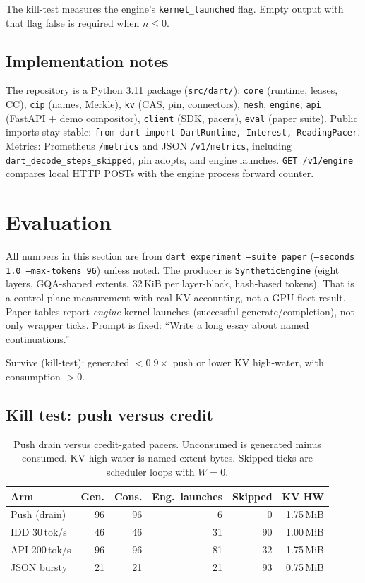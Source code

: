 \documentclass{article}
\theoremstyle{definition}
\begin{document}
The kill-test measures the engine's \texttt{kernel\_launched} flag.
Empty output with that flag false is required when $n \le 0$.

\subsection{Implementation notes}

The repository is a Python 3.11 package (\texttt{src/dart/}): \texttt{core} (runtime, leases, CC), \texttt{cip} (names, Merkle), \texttt{kv} (CAS, pin, connectors), \texttt{mesh}, \texttt{engine}, \texttt{api} (FastAPI + demo compositor), \texttt{client} (SDK, pacers), \texttt{eval} (paper suite).
Public imports stay stable: \texttt{from dart import DartRuntime, Interest, ReadingPacer}.
Metrics: Prometheus \texttt{/metrics} and JSON \texttt{/v1/metrics}, including \texttt{dart\_decode\_steps\_skipped}, pin adopts, and engine launches.
\texttt{GET /v1/engine} compares local HTTP POSTs with the engine process forward counter.

\FloatBarrier
\section{Evaluation}
\label{sec:eval}

All numbers in this section are from \texttt{dart experiment --suite paper} (\texttt{--seconds 1.0 --max-tokens 96}) unless noted.
The producer is \texttt{SyntheticEngine} (eight layers, GQA-shaped extents, 32\,KiB per layer-block, hash-based tokens).
That is a control-plane measurement with real KV accounting, not a GPU-fleet result.
Paper tables report \emph{engine} kernel launches (successful generate/completion), not only wrapper ticks.
Prompt is fixed: ``Write a long essay about named continuations.''

Survive (kill-test): generated $< 0.9\times$ push or lower KV high-water, with consumption $> 0$.

\subsection{Kill test: push versus credit}
\label{sec:kill}

\begin{table}[t]
\centering
\small
\caption{Push drain versus credit-gated pacers. Unconsumed is generated minus consumed. KV high-water is named extent bytes. Skipped ticks are scheduler loops with $W{=}0$.}
\label{tab:kill}
\begin{tabular}{lrrrrr}
\toprule
Arm & Gen. & Cons. & Eng.\ launches & Skipped & KV HW \\
\midrule
Push (drain) & 96 & 96 & 6 & 0 & 1.75\,MiB \\
IDD 30\,tok/s & 46 & 46 & 31 & 90 & 1.00\,MiB \\
API 200\,tok/s & 96 & 96 & 81 & 32 & 1.75\,MiB \\
JSON bursty & 21 & 21 & 21 & 93 & 0.75\,MiB \\
\bottomrule
\end{tabular}
\end{table}
\end{document}
